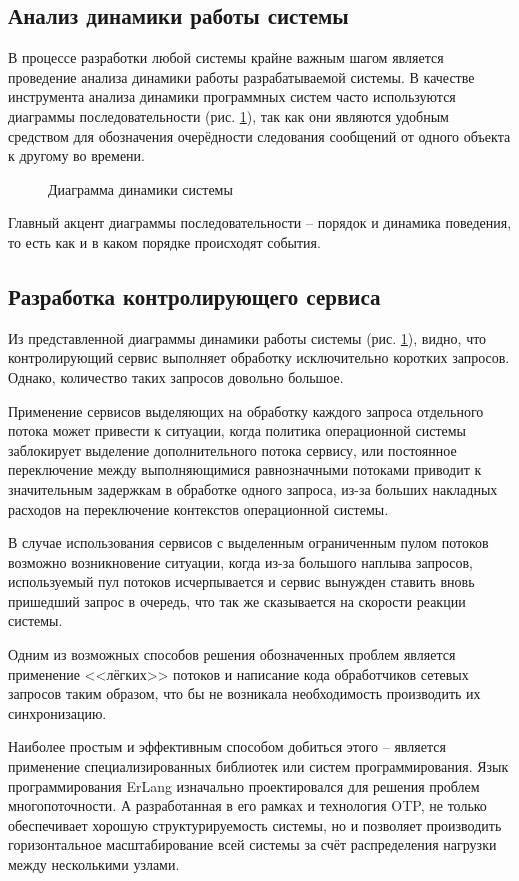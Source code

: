 \subsection{Анализ динамики работы системы}
В процессе разработки любой системы крайне важным шагом является проведение анализа динамики
работы разрабатываемой системы.
В качестве инструмента анализа динамики программных систем часто используются диаграммы последовательности (рис. \ref{img:dynamic}),
так как они являются удобным средством для обозначения очерёдности следования сообщений от одного объекта к другому во времени.
\begin{figure}[h]
	\caption{Диаграмма динамики системы}
	\label{img:dynamic}
\end{figure}
Главный акцент диаграммы последовательности -- порядок и динамика поведения, то есть как и в каком порядке происходят события.

\subsection{Разработка контролирующего сервиса}
Из представленной диаграммы динамики работы системы (рис. \ref{img:dynamic}), видно,
что контролирующий сервис выполняет обработку исключительно коротких запросов. Однако, количество таких
запросов довольно большое.

Применение сервисов выделяющих на обработку каждого запроса отдельного потока может привести к
ситуации, когда политика операционной системы заблокирует выделение дополнительного потока сервису,
или постоянное переключение между выполняющимися равнозначными потоками приводит к значительным задержкам
в обработке одного запроса, из-за больших накладных расходов на переключение контекстов операционной системы.

В случае использования сервисов с выделенным ограниченным пулом потоков возможно возникновение ситуации, когда
из-за большого наплыва запросов, используемый пул потоков исчерпывается и сервис вынужден ставить вновь
пришедший запрос в очередь, что так же сказывается на скорости реакции системы.

Одним из возможных способов решения обозначенных проблем является применение <<лёгких>> потоков и написание кода
обработчиков сетевых запросов таким образом, что бы не возникала необходимость производить их синхронизацию.


Наиболее простым и эффективным способом добиться этого -- является применение специализированных библиотек или
систем программирования. Язык программирования ErLang изначально проектировался для решения проблем
многопоточности. А разработанная в его рамках и технология OTP, не только обеспечивает хорошую структурируемость
системы, но и позволяет производить горизонтальное масштабирование всей системы за счёт распределения нагрузки
между несколькими узлами.




